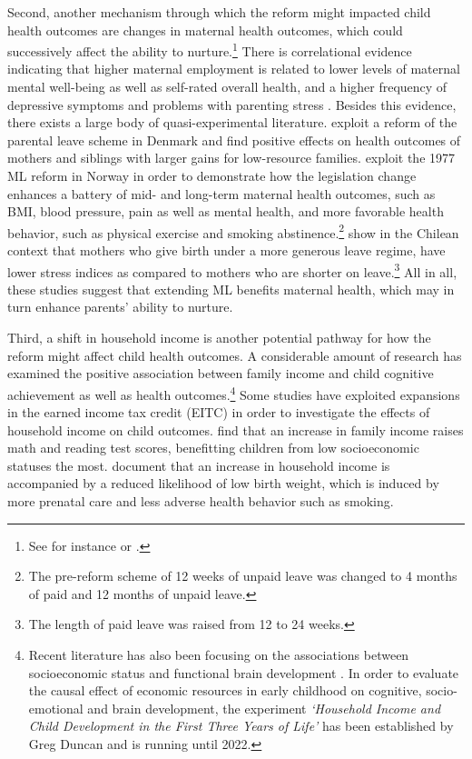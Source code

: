 Second, another mechanism through which the reform might impacted child health outcomes are
changes in maternal health outcomes, which could successively affect the ability to nurture.\footnote{See for instance \cite{patel2004} or \cite{frech2011maternal}.} There is correlational evidence indicating that higher maternal employment is related to lower levels of maternal mental well-being as well as self-rated overall health, and a higher frequency of depressive symptoms and problems with parenting stress \citep{chatterji2005does,Chatterji2013}. Besides this evidence, there exists a large body of quasi-experimental literature. \cite{beuchert2016} exploit a reform of the parental leave scheme in Denmark and find positive effects on health outcomes of mothers and siblings with larger gains for low-resource families. \cite{butikofer2018impact} exploit the 1977 ML reform in Norway in order to demonstrate how the legislation change enhances a battery of mid- and long-term maternal health outcomes, such as BMI, blood pressure, pain as well as mental health, and more favorable health behavior, such as physical exercise and smoking abstinence.\footnote{The pre-reform scheme of 12 weeks of unpaid leave was changed to 4 months of paid and 12 months of unpaid leave.} \cite{albagli2018} show in the Chilean context that mothers who give birth under a more generous leave regime, have lower stress indices as compared to mothers who are shorter on leave.\footnote{The length of paid leave was raised from 12 to 24 weeks.} All in all, these studies suggest that extending ML benefits maternal health, which may in turn enhance parents' ability to nurture. 



Third, a shift in household income is another potential pathway for how the reform might affect child health outcomes. A considerable amount of research has examined the positive association between family income and child cognitive achievement as well as health outcomes.\footnote{Recent literature has also been focusing on the associations between socioeconomic status and functional brain development \citep{tomalski2013}. In order to evaluate the causal effect of economic resources in early childhood on cognitive, socio-emotional and brain development, the experiment \textit{`Household Income and Child Development in the First Three Years of Life'} has been established by Greg Duncan and is running until 2022.} Some studies have exploited expansions in the earned income tax credit (EITC) in order to investigate the effects of household income on child outcomes. \cite{dahl2012impact} find that an increase in family income raises math and reading test scores, benefitting children from low socioeconomic statuses the most. \cite{hoynes2015income} document that an increase in household income is accompanied by a reduced likelihood of low birth weight, which is induced by more prenatal care and less adverse health behavior such as smoking. 




